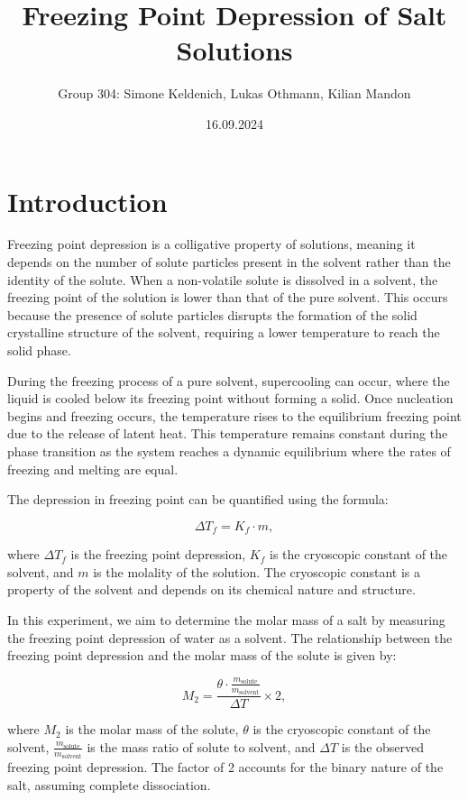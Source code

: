 \documentclass[a4paper,12pt]{article}
\title{Freezing Point Depression of Salt Solutions}
\author{Group 304: Simone Keldenich, Lukas Othmann, Kilian Mandon}
\date{16.09.2024}
\begin{document}
\maketitle

\section{Introduction}
Freezing point depression is a colligative property of solutions, meaning it depends on the number of solute particles present in the solvent rather than the identity of the solute. When a non-volatile solute is dissolved in a solvent, the freezing point of the solution is lower than that of the pure solvent. This occurs because the presence of solute particles disrupts the formation of the solid crystalline structure of the solvent, requiring a lower temperature to reach the solid phase.

During the freezing process of a pure solvent, supercooling can occur, where the liquid is cooled below its freezing point without forming a solid. Once nucleation begins and freezing occurs, the temperature rises to the equilibrium freezing point due to the release of latent heat. This temperature remains constant during the phase transition as the system reaches a dynamic equilibrium where the rates of freezing and melting are equal.

The depression in freezing point can be quantified using the formula:

\begin{equation}
\Delta T_f = K_f \cdot m,
\end{equation}

where $\Delta T_f$ is the freezing point depression, $K_f$ is the cryoscopic constant of the solvent, and $m$ is the molality of the solution. The cryoscopic constant is a property of the solvent and depends on its chemical nature and structure.

In this experiment, we aim to determine the molar mass of a salt by measuring the freezing point depression of water as a solvent. The relationship between the freezing point depression and the molar mass of the solute is given by:

\begin{equation}
M_2 = \frac{\theta \cdot \frac{m_{\text{solute}}}{m_{\text{solvent}}}}{\Delta T} \times 2,
\end{equation}

where $M_2$ is the molar mass of the solute, $\theta$ is the cryoscopic constant of the solvent, $\frac{m_{\text{solute}}}{m_{\text{solvent}}}$ is the mass ratio of solute to solvent, and $\Delta T$ is the observed freezing point depression. The factor of 2 accounts for the binary nature of the salt, assuming complete dissociation.
\end{document}
